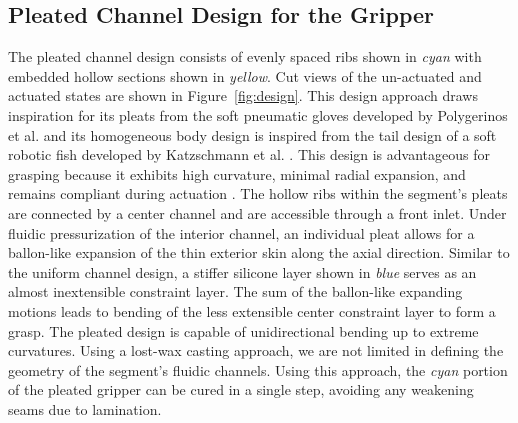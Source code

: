 
\subsection{Pleated Channel Design for the Gripper}
The pleated channel design consists of evenly spaced ribs shown in \emph{cyan} with embedded hollow sections shown in \emph{yellow}.
Cut views of the un-actuated and actuated states are shown in Figure~\ref{fig:design}.
This design approach draws inspiration for its pleats from the soft pneumatic gloves developed by Polygerinos et al. \cite{polygerinos2013towards} and its homogeneous body design is inspired from the tail design of a soft robotic fish developed by Katzschmann et al. \cite{katzschmann2014hydraulic}.
This design is advantageous for grasping because it exhibits high curvature, minimal radial expansion, and remains compliant during actuation \cite{marchese2015recipe}. 
The hollow ribs within the segment's pleats are connected by a center channel and are accessible through a front inlet.
Under fluidic pressurization of the interior channel, an individual pleat allows for a ballon-like expansion of the thin exterior skin along the axial direction.
Similar to the uniform channel design, a stiffer silicone layer shown in \emph{blue} serves as an almost inextensible constraint layer.
The sum of the ballon-like expanding motions leads to bending of the less extensible center constraint layer to form a grasp.
The pleated design is capable of unidirectional bending up to extreme curvatures.
Using a lost-wax casting approach, we are not limited in defining the geometry of the segment's fluidic channels.
Using this approach, the \emph{cyan} portion of the pleated gripper can be cured in a single step, avoiding any weakening seams due to lamination.


